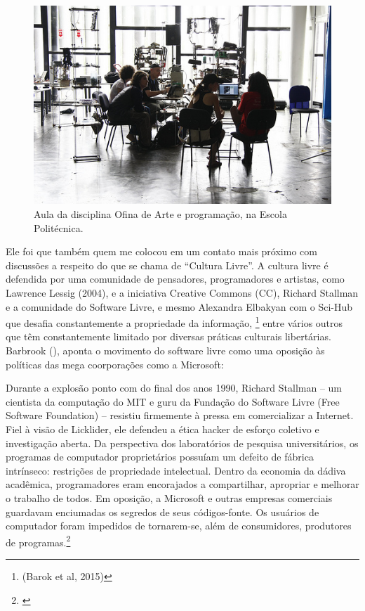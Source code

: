 \begin{figure}

\includegraphics[width=1\textwidth]{pictures/cap1/eti2}
\caption{Aula da disciplina Ofina de Arte e programação, na Escola Politécnica.}
\label{fig:eti2}
\end{figure}

Ele foi que também quem me colocou em um contato mais próximo com discussões a respeito do que se chama de ``Cultura Livre''. A cultura livre é defendida por uma comunidade de pensadores, programadores e artistas, como Lawrence Lessig (2004), e a iniciativa Creative Commons (CC), Richard Stallman e a comunidade do Software Livre, e mesmo Alexandra Elbakyan com o Sci-Hub que desafia constantemente a propriedade da informação, \footnote{(Barok et al, 2015)} entre vários outros que têm constantemente limitado por diversas práticas culturais libertárias. Barbrook (\citeyear{Barbrook2009}), aponta o movimento do software livre como uma oposição às políticas das mega coorporações como a Microsoft:

\begin{citacao}
Durante a explosão ponto com do final dos anos 1990, Richard Stallman – um cientista da computação do MIT e guru da Fundação do Software Livre (Free Software Foundation) – resistiu firmemente à pressa em comercializar a Internet. Fiel à visão de Licklider, ele defendeu a ética hacker de esforço coletivo e investigação aberta. Da perspectiva dos laboratórios de pesquisa universitários, os programas de computador proprietários possuíam um defeito de fábrica intrínseco: restrições de propriedade intelectual. Dentro da economia da dádiva acadêmica, programadores eram encorajados a compartilhar, apropriar e melhorar o trabalho de todos. Em oposição, a Microsoft e outras empresas comerciais guardavam enciumadas os segredos de seus códigos-fonte. Os usuários de computador foram impedidos de tornarem-se, além de consumidores, produtores de programas.\footnote{\cite[367]{Barbrook2009}}
\end{citacao}

